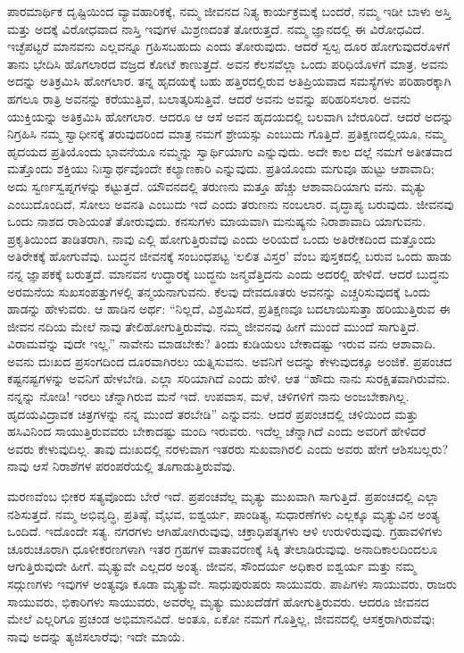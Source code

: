 ಪಾರಮಾರ್ಥಿಕ ದೃಷ್ಟಿಯಿಂದ ವ್ಯಾವಹಾರಿಕಕ್ಕೆ, ನಮ್ಮ ಜೀವನದ ನಿತ್ಯ ಕಾರ್ಯಕ್ರಮಕ್ಕೆ ಬಂದರೆ, ನಮ್ಮ ಇಡೀ ಬಾಳು ಅಸ್ತಿ ಮತ್ತು ಅದಕ್ಕೆ ವಿರೋಧವಾದ ನಾಸ್ತಿ ಇವುಗಳ ಮಿಶ್ರಣದಂತೆ ತೋರುತ್ತದೆ. ನಮ್ಮ ಜ್ಞಾನದಲ್ಲಿ ಈ ವಿರೋಧವಿದೆ. ಇಚ್ಛೆಪಟ್ಟರೆ ಮಾನವನು ಎಲ್ಲವನ್ನೂ ಗ್ರಹಿಸಬಹುದು ಎಂದು ತೋರುವುದು. ಆದರೆ ಸ್ವಲ್ಪ ದೂರ ಹೋಗುವುದರೊಳಗೆ ತಾನು ಭೇದಿಸಿ ಹೊಗಲಾರದ ವಜ್ರದ ಕೋಟೆ ಕಾಣುತ್ತದೆ. ಅವನ ಕೆಲಸವೆಲ್ಲಾ ಒಂದು ಪರಿಧಿಯೊಳಗೆ ಮಾತ್ರ. ಅವನು ಅದನ್ನು ಅತಿಕ್ರಮಿಸಿ ಹೋಗಲಾರ. ತನ್ನ ಹೃದಯಕ್ಕೆ ಬಹು ಹತ್ತಿರದಲ್ಲಿರುವ ಅತಿಪ್ರಿಯವಾದ ಸಮಸ್ಯೆಗಳು ಪರಿಹಾರಕ್ಕಾಗಿ ಹಗಲೂ ರಾತ್ರಿ ಅವನನ್ನು ಕರೆಯುತ್ತಿವೆ, ಬಲಾತ್ಕರಿಸುತ್ತಿವೆ. ಆದರೆ ಅವನು ಅವನ್ನು ಪರಿಹರಿಸಲಾರ. ಅವನು ಯುಕ್ತಿಯನ್ನು ಅತಿಕ್ರಮಿಸಿ ಹೋಗಲಾರ. ಆದರೂ ಆ ಆಸೆ ಅವನ ಹೃದಯದಲ್ಲಿ ಬಲವಾಗಿ ಬೇರೂರಿದೆ. ಆದರೆ ಅದನ್ನು ನಿಗ್ರಹಿಸಿ ನಮ್ಮ ಸ್ವಾಧೀನಕ್ಕೆ ತರುವುದರಿಂದ ಮಾತ್ರ ನಮಗೆ ಶ್ರೇಯಸ್ಸು ಎಂಬುದು ಗೊತ್ತಿದೆ. ಪ್ರತಿಕ್ಷಣದಲ್ಲಿಯೂ, ನಮ್ಮ ಹೃದಯದ ಪ್ರತಿಯೊಂದು ಭಾವನೆಯೂ ನಮ್ಮನ್ನು ಸ್ವಾರ್ಥಿಯಾಗು ಎನ್ನುವುದು. ಅದೇ ಕಾಲ ದಲ್ಲೆ ನಮಗೆ ಅತೀತವಾದ ಮತ್ತೊಂದು ಶಕ್ತಿಯು ನಿಃಸ್ವಾರ್ಥವೊಂದೇ ಕಲ್ಯಾಣಕಾರಿ ಎನ್ನುವುದು. ಪ್ರತಿಯೊಂದು ಮಗುವೂ ಹುಟ್ಟು ಆಶಾವಾದಿ; ಅದು ಸ್ವರ್ಣಸ್ವಪ್ನಗಳನ್ನು ಕಟ್ಟುತ್ತದೆ. ಯೌವನದಲ್ಲಿ ತರುಣನು ಮತ್ತೂ ಹೆಚ್ಚು ಆಶಾವಾದಿಯಾಗು ವನು. ಮೃತ್ಯು ಎಂಬುದೊಂದಿದೆ, ಸೋಲು ಅವನತಿ ಎಂಬುದು ಇದೆ ಎಂದು ತರುಣನು ನಂಬಲಾರ. ವೃದ್ಧಾಪ್ಯ ಬರುವುದು. ಜೀವನವು ಒಂದು ನಾಶದ ರಾಶಿಯಂತೆ ತೋರುವುದು. ಕನಸುಗಳು ಮಾಯವಾಗಿ ಮನುಷ್ಯನು ನಿರಾಶಾವಾದಿ ಯಾಗುವನು. ಪ್ರಕೃತಿಯಿಂದ ತಾಡಿತರಾಗಿ, ನಾವು ಎಲ್ಲಿ ಹೋಗುತ್ತಿರುವೆವು ಎಂದು ಅರಿಯದೆ ಒಂದು ಅತಿರೇಕದಿಂದ ಮತ್ತೊಂದು ಅತಿರೇಕಕ್ಕೆ ಹೋಗುವೆವು. ಬುದ್ಧನ ಜೀವನಕ್ಕೆ ಸಂಬಂಧಪಟ್ಟ ‘ಲಲಿತ ವಿಸ್ತರ’ ವೆಂಬ ಪುಸ್ತಕದಲ್ಲಿ ಬರುವ ಒಂದು ಹಾಡು ನನ್ನ ಜ್ಞಾಪಕಕ್ಕೆ ಬರುತ್ತದೆ. ಮಾನವನ ಉದ್ಧಾರಕ್ಕೆ ಬುದ್ಧನು ಜನ್ಮವೆತ್ತಿದನು ಎಂದು ಅದರಲ್ಲಿ ಹೇಳಿದೆ. ಆದರೆ ಬುದ್ಧನು ಅರಮನೆಯ ಸುಖಸಂಪತ್ತುಗಳಲ್ಲಿ ತನ್ಮಯನಾಗುವನು. ಕೆಲವು ದೇವದೂತರು ಅವನನ್ನು ಎಚ್ಚರಿಸುವುದಕ್ಕೆ ಒಂದು ಹಾಡನ್ನು ಹೇಳುವರು. ಆ ಹಾಡಿನ ಅರ್ಥ: “ನಿಲ್ಲದೆ, ವಿಶ್ರಮಿಸದೆ, ಪ್ರತಿಕ್ಷಣವೂ ಬದಲಾಯಿಸುತ್ತಾ ಹರಿಯುತ್ತಿರುವ ಈ ಜೀವನ ನದಿಯ ಮೇಲೆ ನಾವು ತೇಲಿಹೋಗುತ್ತಿರುವೆವು. ನಮ್ಮ ಜೀವನವು ಹೀಗೆ ಮುಂದೆ ಮುಂದೆ ಸಾಗುತ್ತಿದೆ. ವಿರಾಮವೆನ್ನು ವುದೇ ಇಲ್ಲ.” ನಾವೇನು ಮಾಡಬೇಕು? ತಿಂದು ಕುಡಿಯಲು ಬೇಕಾದಷ್ಟು ಇರುವ ವನು ಆಶಾವಾದಿ. ಅವನು ದುಃಖದ ಪ್ರಸಂಗದಿಂದ ದೂರವಾಗಿರಲು ಯತ್ನಿಸುವನು. ಅವನಿಗೆ ಅದನ್ನು ಕೇಳುವುದಕ್ಕೂ ಅಂಜಿಕೆ. ಪ್ರಪಂಚದ ಕಷ್ಟನಷ್ಟಗಳನ್ನು ಅವನಿಗೆ ಹೇಳಬೇಡಿ. ಎಲ್ಲಾ ಸರಿಯಾಗಿದೆ ಎಂದು ಹೇಳಿ. ಆತ “ಹೌದು ನಾನು ಸುರಕ್ಷಿತವಾಗಿರುವೆನು. ನನ್ನನ್ನು ನೋಡಿ! ಇರಲು ಚೆನ್ನಾಗಿರುವ ಮನೆ ಇದೆ. ಉಪವಾಸ, ಮಳೆ, ಚಳಿಗಳಿಗೆ ನಾನು ಅಂಜಬೇಕಾಗಿಲ್ಲ. ಹೃದಯವಿದ್ರಾವಕ ಚಿತ್ರಗಳನ್ನು ನನ್ನ ಮುಂದೆ ತರಬೇಡಿ” ಎನ್ನುವನು. ಆದರೆ ಪ್ರಪಂಚದಲ್ಲಿ ಚಳಿಯಿಂದ ಮತ್ತು ಹಸಿವಿನಿಂದ ಸಾಯುತ್ತಿರುವವರು ಬೇಕಾದಷ್ಟು ಮಂದಿ ಇರುವರು. ಇದೆಲ್ಲ ಚೆನ್ನಾಗಿದೆ ಎಂದು ಅವರಿಗೆ ಹೇಳಿದರೆ ಅವರು ಕೇಳುವುದಿಲ್ಲ. ತಾವು ದುಃಖದಲ್ಲಿ ನರಳುವಾಗ ಇತರರು ಸುಖವಾಗಿರಲಿ ಎಂದು ಅವರು ಹೇಗೆ ಆಶಿಸಬಲ್ಲರು? ನಾವು ಆಸೆ ನಿರಾಶೆಗಳ ಪರಂಪರೆಯಲ್ಲಿ ತೂಗಾಡುತ್ತಿರುವೆವು.

ಮರಣವೆಂಬ ಭೀಕರ ಸತ್ಯವೊಂದು ಬೇರೆ ಇದೆ. ಪ್ರಪಂಚವೆಲ್ಲ ಮೃತ್ಯು ಮುಖವಾಗಿ ಸಾಗುತ್ತಿದೆ. ಪ್ರಪಂಚದಲ್ಲಿ ಎಲ್ಲಾ ನಶಿಸುತ್ತದೆ. ನಮ್ಮ ಅಭಿವೃದ್ಧಿ, ಪ್ರತಿಷ್ಠೆ, ವೈಭವ, ಐಶ್ವರ್ಯ, ಪಾಂಡಿತ್ಯ, ಸುಧಾರಣೆಗಳು ಎಲ್ಲಕ್ಕೂ ಮೃತ್ಯುವಿನ ಅಂತ್ಯ ಒಂದಿದೆ. ಇದೊಂದೇ ಸತ್ಯ. ನಗರಗಳು ಆಗಿಹೋಗಿರುವುವು, ಚಕ್ರಾಧಿಪತ್ಯಗಳು ಆಳಿ ಉರುಳಿರುವುವು. ಗ್ರಹಾವಳಿಗಳು ಚೂರುಚೂರಾಗಿ ಧೂಳೀಕರಣಗಳಾಗಿ ಇತರ ಗ್ರಹಗಳ ವಾತಾವರಣಕ್ಕೆ ಸಿಕ್ಕಿ ತೇಲಾಡಿರುವುವು. ಅನಾದಿಕಾಲದಿಂದಲೂ ಆಗುತ್ತಿರುವುದೇ ಹೀಗೆ. ಮೃತ್ಯುವೇ ಎಲ್ಲದರ ಅಂತ್ಯ. ಜೀವನ, ಸೌಂದರ್ಯ ಅಧಿಕಾರ ಐಶ್ವರ್ಯ ಮತ್ತು ನಮ್ಮ ಸದ್ಗುಣಗಳು ಇವುಗಳ ಅಂತ್ಯವೂ ಕೂಡಾ ಮೃತ್ಯುವೇ. ಸಾಧುಪುರುಷರು ಸಾಯುವರು. ಪಾಪಿಗಳು ಸಾಯುವರು, ರಾಜರು ಸಾಯುವರು, ಭಿಕಾರಿಗಳು ಸಾಯುವರು, ಅವರೆಲ್ಲ ಮೃತ್ಯು ಮುಖದೆಡೆಗೆ ಹೋಗುತ್ತಿರುವರು. ಆದರೂ ಜೀವನದ ಮೇಲೆ ಎಲ್ಲರಿಗೂ ಪ್ರಚಂಡ ಅಭಿಮಾನವಿದೆ. ಅಂತೂ, ಏಕೋ ನಮಗೆ ಗೊತ್ತಿಲ್ಲ, ಜೀವನದಲ್ಲಿ ಆಸಕ್ತರಾಗಿರುವೆವು; ನಾವು ಅದನ್ನು ತ್ಯಜಿಸಲಾರೆವು; ಇದೇ ಮಾಯೆ.

